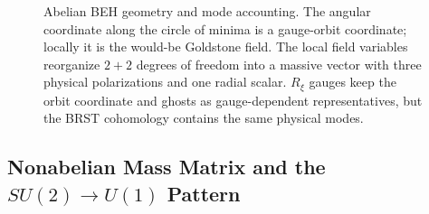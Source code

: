 \begin{figure}[H]
{
  }
  \caption{Abelian BEH geometry and mode accounting.  The angular coordinate
  along the circle of minima is a gauge-orbit coordinate; locally it is the
  would-be Goldstone field.  The local field variables reorganize
  \(2+2\) degrees of freedom into a massive vector with three physical
  polarizations and one radial scalar.  \(R_\xi\) gauges keep the orbit
  coordinate and ghosts as gauge-dependent representatives, but the BRST
  cohomology contains the same physical modes.}
  \label{fig:abelian-beh-mode-accounting}
\end{figure}

\subsection{Nonabelian Mass Matrix and the \texorpdfstring{\(SU(2)\to U(1)\)}{SU(2) to U(1)} Pattern}

